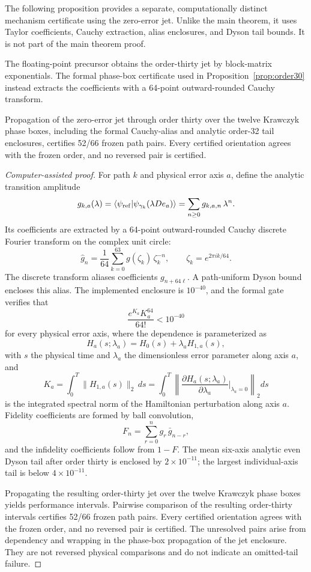 The following proposition provides a separate, computationally distinct mechanism
certificate using the zero-error jet. Unlike the main theorem, it uses Taylor coefficients,
Cauchy extraction, alias enclosures, and Dyson tail bounds. It is not part of the main
theorem proof.

The floating-point precursor obtains the order-thirty jet by block-matrix exponentials. The
formal phase-box certificate used in Proposition~\ref{prop:order30} instead extracts the
coefficients with a 64-point outward-rounded Cauchy transform.

\begin{proposition}\label{prop:order30}
Propagation of the zero-error jet through order thirty over the twelve Krawczyk phase
boxes, including the formal Cauchy-alias and analytic order-32 tail enclosures, certifies
52/66 frozen path pairs. Every certified orientation agrees with the frozen order, and no
reversed pair is certified.
\end{proposition}

\begin{proof}[Computer-assisted proof]
For path $k$ and physical error axis $a$, define the analytic transition amplitude
\[
g_{k,a}(\lambda)=\langle \psi_{\mathrm{ref}} \vert \psi_{\gamma_{k}}(\lambda De_{a}) \rangle
=\sum_{n\ge0}g_{k,a,n}\,\lambda^{n}.
\]
Its coefficients are extracted by a 64-point outward-rounded Cauchy discrete Fourier
transform on the complex unit circle:
\begin{equation}\label{eq:cauchy}
\widehat{g}_{n}=\frac{1}{64}\sum_{k=0}^{63}g(\zeta_{k})\,\zeta_{k}^{-n},
\qquad \zeta_{k}=e^{2\pi i k/64}.
\end{equation}
The discrete transform aliases coefficients $g_{n+64\ell}$. A path-uniform Dyson
bound~\cite{dyson1949} encloses this alias. The implemented enclosure is $10^{-40}$, and the formal gate verifies
that
\[
\frac{e^{K_{a}}K_{a}^{64}}{64!}<10^{-40}
\]
for every physical error axis, where the dependence is parameterized as
\[
H_{a}(s;\lambda_{a})=H_{0}(s)+\lambda_{a}H_{1,a}(s),
\]
with $s$ the physical time and $\lambda_{a}$ the dimensionless error parameter along axis
$a$, and
\[
K_{a}=\int_{0}^{T}\lVert H_{1,a}(s)\rVert_{2}\,ds
=\int_{0}^{T}\left\lVert
\frac{\partial H_{a}(s;\lambda_{a})}{\partial\lambda_{a}}
\bigg|_{\lambda_{a}=0}\right\rVert_{2}ds
\]
is the integrated spectral norm of the Hamiltonian perturbation along axis $a$. Fidelity
coefficients are formed by ball convolution,
\[
F_{n}=\sum_{r=0}^{n}g_{r}\,\bar{g}_{n-r},
\]
and the infidelity coefficients follow from $1-F$. The mean six-axis analytic even Dyson
tail after order thirty is enclosed by $2\times10^{-11}$; the largest individual-axis tail
is below $4\times10^{-11}$.

Propagating the resulting order-thirty jet over the twelve Krawczyk phase boxes yields
performance intervals. Pairwise comparison of the resulting order-thirty intervals
certifies 52/66 frozen path pairs. Every certified orientation agrees with the frozen
order, and no reversed pair is certified. The unresolved pairs arise from dependency and
wrapping in the phase-box propagation of the jet enclosure. They are not reversed physical
comparisons and do not indicate an omitted-tail failure.
\end{proof}
